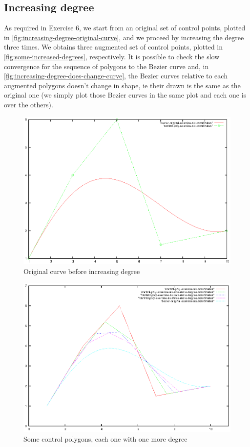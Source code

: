 \documentclass{article}
\begin{document}
\subsection{Increasing degree}
As required in Exercise 6, we start from an original set of control
points, plotted in \autoref{fig:increasing-degree-original-curve}, and
we proceed by increasing the degree three times. We obtains three
augmented set of control points, plotted in
\autoref{fig:some-increased-degrees}, respectively. It is possible to
check the slow convergence for the sequence of polygons to the Bezier
curve and, in \autoref{fig:increasing-degree-does-change-curve}, the
Bezier curves relative to each augmented polygons doesn't change in
shape, ie their drawn is the same as the original one (we simply plot
those Bezier curves in the same plot and each one is over the others).
\begin{figure}
  \centering
  \includegraphics{bezier-deCasteljau-curves/exercise-six-original}
  \caption{Original curve before increasing degree}
  \label{fig:increasing-degree-original-curve}
\end{figure}
\begin{figure}
  \centering
  \includegraphics{bezier-deCasteljau-curves/exercise-six-higher-degree-control-poly}
  \caption{Some control polygons, each one with one more degree}
  \label{fig:some-increased-degrees}
\end{figure}
\end{document}
